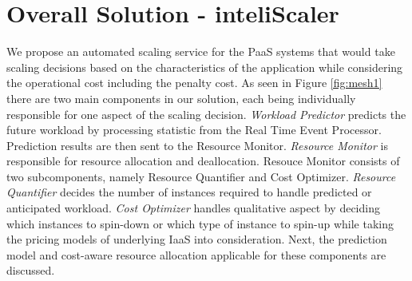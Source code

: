 \section{Overall Solution - inteliScaler}
We propose an automated scaling service for the PaaS systems that would take scaling decisions based on the characteristics of the application while considering the operational cost including the penalty cost. As seen in Figure \ref{fig:mesh1} there are two main components in our solution, each being individually responsible for one aspect of the scaling decision. \textit{Workload Predictor} predicts the future workload by processing statistic from the Real Time Event Processor. Prediction results are then sent to the Resource Monitor. \textit{Resource Monitor} is responsible for resource allocation and deallocation. Resouce Monitor consists of two subcomponents, namely Resource Quantifier and Cost Optimizer. \textit{Resource Quantifier} decides the number of instances required to handle predicted or anticipated workload. \textit{Cost Optimizer} handles qualitative aspect by deciding which instances to spin-down or which type of instance to spin-up while taking the pricing models of underlying IaaS into consideration. Next, the prediction model and cost-aware resource allocation applicable for these components are discussed.